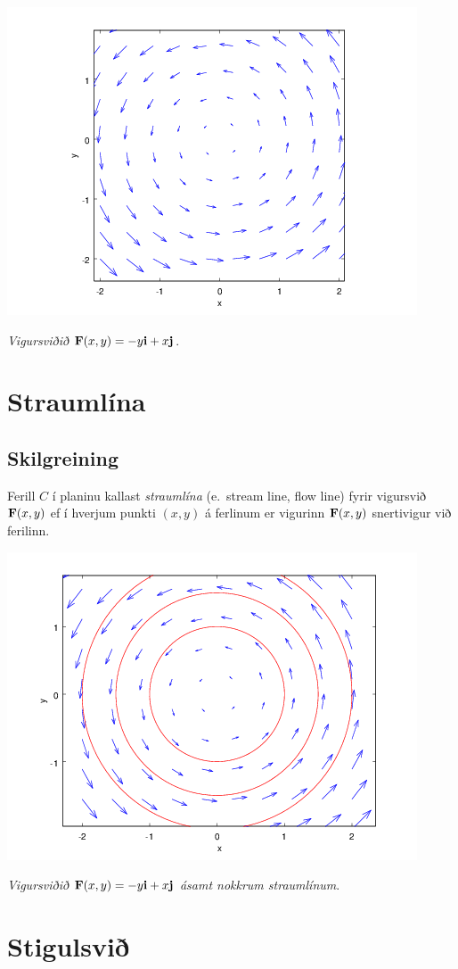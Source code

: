 \documentclass[a4paper,10pt,icelandic]{sphinxmanual}
\begin{document}
{\hfill\includegraphics[width=0.700\linewidth]{vfield.png}\hfill}

\emph{Vigursviðið} \(\mathbf{F}(x,y) = -y\mbox{${\bf i}$}+ x \mbox{${\bf j}$}\).


\section{Straumlína}
\label{Kafli5:straumlina}

\subsection{Skilgreining}
\label{Kafli5:id2}
Ferill \(C\) í planinu kallast \emph{straumlína} (e. stream line, flow
line) fyrir vigursvið \(\mbox{${\bf F}$}(x,y)\) ef í hverjum punkti
\((x,y)\) á ferlinum er vigurinn \(\mbox{${\bf F}$}(x,y)\)
snertivigur við ferilinn.

{\hfill\includegraphics[width=0.700\linewidth]{flowlines.png}\hfill}

\emph{Vigursviðið} \(\mathbf{F}(x,y) = -y\mbox{${\bf i}$}+ x \mbox{${\bf j}$}\)
\emph{ásamt nokkrum straumlínum}.


\section{Stigulsvið}
\label{Kafli5:stigulsvi}
\end{document}
